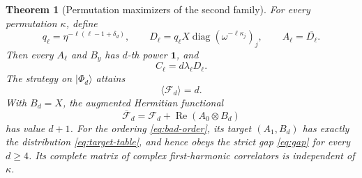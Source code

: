\documentclass[11pt]{article}
\newtheorem{theorem}{Theorem}[section]
\theoremstyle{remark}
\newcommand{\Id}{\mathbf 1}
\newcommand{\cF}{\mathcal F}
\newcommand{\Reop}{\operatorname{Re}}
\begin{document}
\begin{theorem}[Permutation maximizers of the second family]
\label{thm:second}
For every permutation \(\kappa\), define
\[
q_\ell=\eta^{-\ell(\ell-1+\delta_d)},\qquad
D_\ell
=q_\ell X\operatorname{diag}
\left(\omega^{-\ell\kappa_j}\right)_j,
\qquad
A_\ell=\overline{D_\ell}.
\]
Then every \(A_\ell\) and \(B_y\) has \(d\)-th power \(\Id\), and
\[
C_\ell=d\lambda_\ell D_\ell.
\]
The strategy on \(\lvert\Phi_d\rangle\) attains
\[
\langle\cF_d\rangle=d.
\]
With \(B_d=X\), the augmented Hermitian functional
\[
\overline{\cF}_d
=\cF_d+\Reop(A_0\otimes B_d)
\]
has value \(d+1\).  For the ordering \eqref{eq:bad-order}, its target
\((A_1,B_d)\) has exactly the distribution
\eqref{eq:target-table}, and hence obeys the strict gap
\eqref{eq:gap} for every \(d\geq4\).  Its complete matrix of complex
first-harmonic correlators is independent of \(\kappa\).
\end{theorem}
\end{document}
